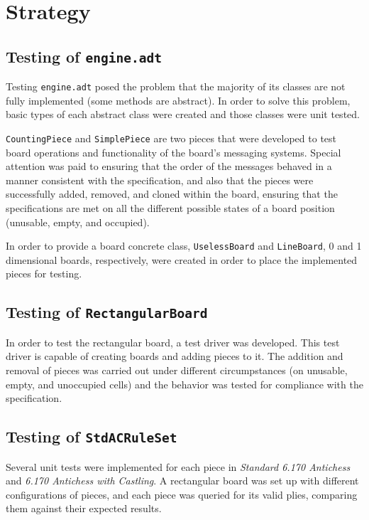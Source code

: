 \section{Strategy}

	\subsection{Testing of \texttt{engine.adt}}
	Testing \texttt{engine.adt} posed the problem that the majority of its classes are not fully implemented (some methods
	are abstract). In order to solve this problem, basic types of each abstract class were created and those classes 
	were unit tested. 
	
	\texttt{CountingPiece} and \texttt{SimplePiece} are two pieces that were developed to test board operations and functionality 
	of the board's messaging systems. Special attention was paid to ensuring that the order of the messages behaved
	in a manner consistent with the specification, and also that the pieces were successfully added, removed, and cloned
	within the board, ensuring that the specifications are met on all the different possible states of a board position
	(unusable, empty, and occupied).  
	
	In order to provide a board concrete class, \texttt{UselessBoard} and \texttt{LineBoard}, 0 and 1 dimensional boards, 
	respectively, were created in order to place the implemented pieces for testing. 	
	
	\subsection{Testing of \texttt{RectangularBoard}} In order to test the rectangular board, a test driver was developed.
	This test driver is capable of creating boards and adding pieces to it. The addition and removal of pieces was carried 
	out under different circumpstances (on unusable, empty, and unoccupied cells) and the behavior was tested for 
	compliance with the specification. 
	
	\subsection{Testing of \texttt{StdACRuleSet}} Several unit tests were implemented for each piece in \emph{Standard 
												6.170 Antichess} and \emph{6.170 Antichess with Castling}. A rectangular board was set up with 
												different configurations of pieces, and each piece was queried for its valid plies, 
												comparing them against their expected results. 
												

